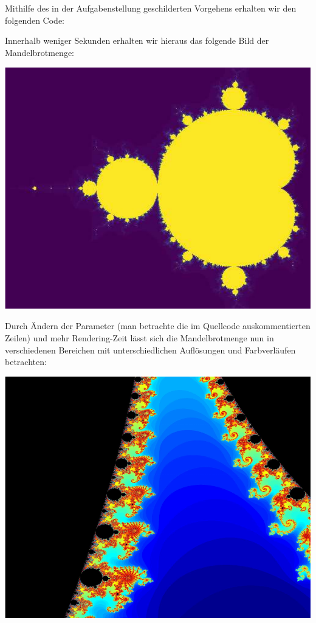 \section{}

Mithilfe des in der Aufgabenstellung geschilderten Vorgehens erhalten wir den folgenden Code:



Innerhalb weniger Sekunden erhalten wir hieraus das folgende Bild der Mandelbrotmenge:

\begin{center}
  \includegraphics[width = \textwidth]{chapter_08/exercise_08_44_figure_1.pdf}
\end{center}

Durch Ändern der Parameter (man betrachte die im Quellcode auskommentierten Zeilen) und mehr Rendering-Zeit lässt sich die Mandelbrotmenge nun in verschiedenen Bereichen mit unterschiedlichen Auflösungen und Farbverläufen betrachten:

\begin{center}
  \includegraphics[width = \textwidth]{chapter_08/exercise_08_44_figure_2.pdf}
\end{center}
